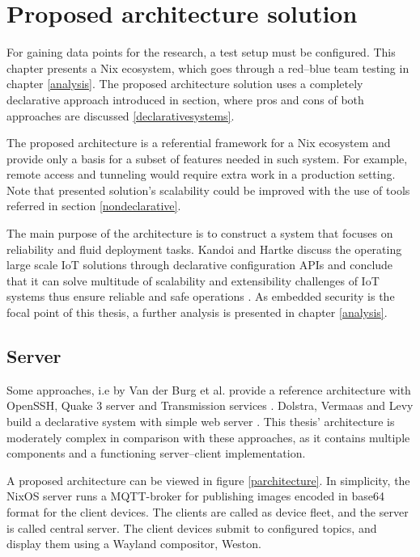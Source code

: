 \chapter{Proposed architecture solution} \label{architecture}

For gaining data points for the research, a test setup must be
configured. This chapter presents a Nix ecosystem, which goes through
a red–blue team testing in chapter \ref{analysis}. The proposed
architecture solution uses a completely declarative approach
introduced in section, where pros and cons of both approaches are
discussed \ref{declarativesystems}.

The proposed architecture is a referential framework for a Nix
ecosystem and provide only a basis for a subset of features needed in
such system. For example, remote access and tunneling would require
extra work in a production setting. Note that presented solution's
scalability could be improved with the use of tools referred in
section \ref{nondeclarative}.

The main purpose of the architecture is to construct a system that
focuses on reliability and fluid deployment tasks. Kandoi and Hartke
discuss the operating large scale IoT solutions through declarative
configuration APIs and conclude that it can solve multitude of
scalability and extensibility challenges of IoT systems thus ensure
reliable and safe operations \cite{kandoi2021operating}. As embedded
security is the focal point of this thesis, a further analysis is
presented in chapter \ref{analysis}.

\section{Server}

Some approaches, i.e by Van der Burg et al. provide a reference
architecture with OpenSSH, Quake 3 server and Transmission services
\cite{van2013reference}. Dolstra, Vermaas and Levy build a declarative
system with simple web server \cite{dolstra2013charon}. This thesis'
architecture is moderately complex in comparison with these approaches,
as it contains multiple components and a functioning server–client
implementation.

A proposed architecture can be viewed in figure
\ref{parchitecture}. In simplicity, the NixOS server runs a
MQTT-broker for publishing images encoded in base64 format for the
client devices. The clients are called as device fleet, and the server
is called central server. The client devices submit to configured
topics, and display them using a Wayland compositor, Weston.

